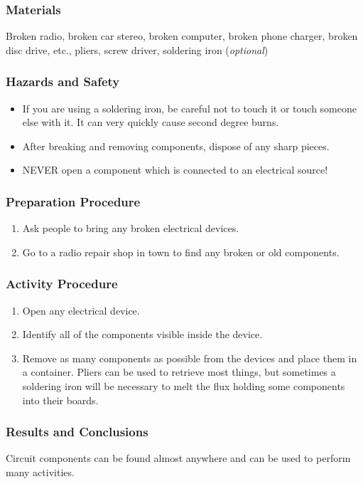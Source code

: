 \subsubsection*{Materials}
Broken radio, broken car stereo, broken computer, broken phone charger, broken disc drive, etc., pliers, screw driver, soldering iron (\textit{optional})

\subsubsection*{Hazards and Safety}
\begin{itemize}
\item{If you are using a soldering iron, be careful not to touch it or touch someone else with it. It can very quickly cause second degree burns.} 
\item{After breaking and removing components, dispose of any sharp pieces.} 
\item{NEVER open a component which is connected to an electrical source!} 
\end{itemize}

\subsubsection*{Preparation Procedure}
\begin{enumerate}
\item{Ask people to bring any broken electrical devices.} 
\item{Go to a radio repair shop in town to find any broken or old components.} 
\end{enumerate}

\subsubsection*{Activity Procedure}
\begin{enumerate}
\item{Open any electrical device.} 
\item{Identify all of the components visible inside the device.} 
\item{Remove as many components as possible from the devices and place them in a container. Pliers can be used to retrieve most things, but sometimes a soldering iron will be necessary to melt the flux holding some components into their boards.} 
\end{enumerate}

\subsubsection*{Results and Conclusions}
Circuit components can be found almost anywhere and can be used to perform many activities.

